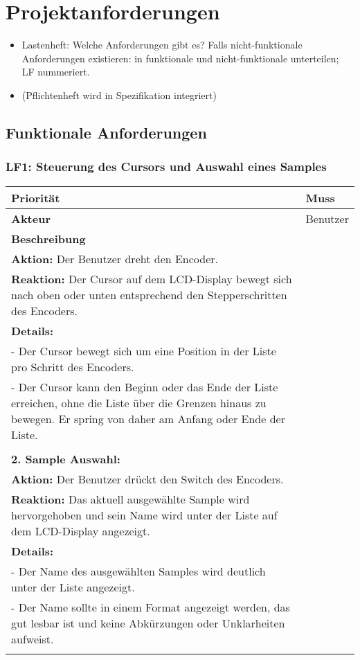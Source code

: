 \newpage
\section{Projektanforderungen}
\begin{itemize}
    \item Lastenheft: Welche Anforderungen gibt es? Falls nicht-funktionale Anforderungen existieren: in funktionale und nicht-funktionale unterteilen; LF nummeriert.
    \item (Pflichtenheft wird in Spezifikation integriert)
\end{itemize}

\subsection{Funktionale Anforderungen}

\subsubsection{LF1: Steuerung des Cursors und Auswahl eines Samples}

\begin{longtable}[c]{|p{3cm}|p{13cm}|}
\hline
\textbf{Priorität} & Muss \\
\hline
\textbf{Akteur} & Benutzer \\
\hline
\textbf{Beschreibung} & 
\begin{tabularx}{13cm}{X}
\textbf{1. Cursor Bewegung:} \\
\textbf{Aktion:} Der Benutzer dreht den Encoder. \\
\textbf{Reaktion:} Der Cursor auf dem LCD-Display bewegt sich nach oben oder unten entsprechend den Stepperschritten des Encoders. \\
\textbf{Details:} \\
- Der Cursor bewegt sich um eine Position in der Liste pro Schritt des Encoders. \\
- Der Cursor kann den Beginn oder das Ende der Liste erreichen, ohne die Liste über die Grenzen hinaus zu bewegen. Er spring von daher am Anfang oder Ende der Liste. \\
\\
\textbf{2. Sample Auswahl:} \\
\textbf{Aktion:} Der Benutzer drückt den Switch des Encoders. \\
\textbf{Reaktion:} Das aktuell ausgewählte Sample wird hervorgehoben und sein Name wird unter der Liste auf dem LCD-Display angezeigt. \\
\textbf{Details:} \\
- Der Name des ausgewählten Samples wird deutlich unter der Liste angezeigt. \\
- Der Name sollte in einem Format angezeigt werden, das gut lesbar ist und keine Abkürzungen oder Unklarheiten aufweist. \\
\end{tabularx} \\
\hline
\end{longtable}

